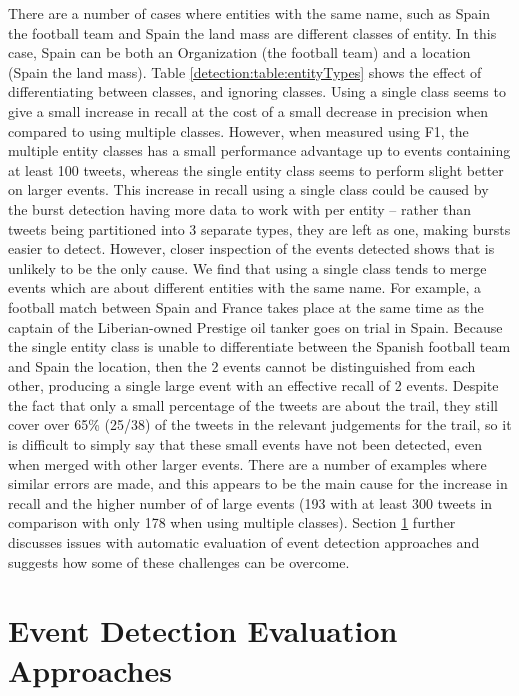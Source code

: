 There are a number of cases where entities with the same name, such as Spain the football team and Spain the land mass are different classes of entity. In this case, Spain can be both an Organization (the football team) and a location (Spain the land mass).
Table \ref{detection:table:entityTypes} shows the effect of differentiating between classes, and ignoring classes. Using a single class seems to give a small increase in recall at the cost of a small decrease in precision when compared to using multiple classes. However, when measured using F1, the multiple entity classes has a small performance advantage up to events containing at least 100 tweets, whereas the single entity class seems to perform slight better on larger events. This increase in recall using a single class could be caused by the burst detection having more data to work with per entity -- rather than tweets being partitioned into 3 separate types, they are left as one, making bursts easier to detect. However, closer inspection of the events detected shows that is unlikely to be the only cause. We find that using a single class tends to merge events which are about different entities with the same name. For example, a football match between Spain and France takes place at the same time as the captain of the Liberian-owned Prestige oil tanker goes on trial in Spain. Because the single entity class is unable to differentiate between the Spanish football team and Spain the location, then the 2 events cannot be distinguished from each other, producing a single large event with an effective recall of 2 events. Despite the fact that only a small percentage of the tweets are about the trail, they still cover over 65\% (25/38) of the tweets in the relevant judgements for the trail, so it is difficult to simply say that these small events have not been detected, even when merged with other larger events. There are a number of examples where similar errors are made, and this appears to be the main cause for the increase in recall and the higher number of of large events (193 with at least 300 tweets in comparison with only 178 when using multiple classes). Section \ref{detection:sec:measures} further discusses issues with automatic evaluation of event detection approaches and  suggests how some of these challenges can be overcome.

\section{Event Detection Evaluation Approaches}
\label{detection:sec:measures}

